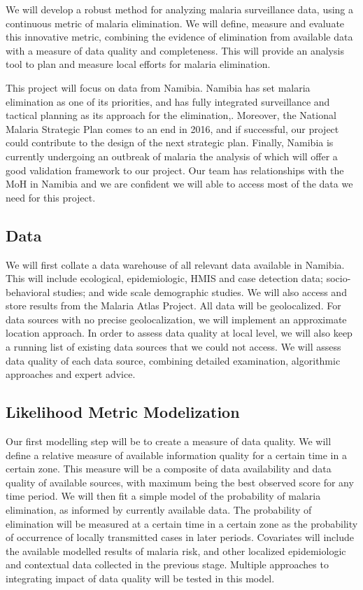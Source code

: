 \documentclass[a4paper,11pt,draft,twoside]{article}
\begin{document}
We will develop a robust method for analyzing malaria surveillance data, using a continuous metric of malaria elimination. We will define, measure and evaluate this innovative metric, combining the evidence of elimination from available data with a measure of data quality and completeness. This will provide an analysis tool to plan and measure local efforts for malaria elimination.

This project will focus on data from Namibia. Namibia has set malaria elimination as one of its priorities\cite{NamibiaElimniation}, and has fully integrated surveillance and tactical planning as its approach for the elimination\cite{StrengtheningTactical},\cite{NamStratPlan}. Moreover, the National Malaria Strategic Plan comes to an end in 2016, and if successful, our project could contribute to the design of the next strategic plan. Finally, Namibia is currently undergoing an outbreak of malaria the analysis of which will offer a good validation framework to our project. Our team has relationships with the MoH in Namibia and we are confident we will able to access most of the data we need for this project.

\subsection{Data}

We will first collate a data warehouse of all relevant data available in Namibia. This will include ecological, epidemiologic, HMIS and case detection data; socio-behavioral studies; and wide scale demographic studies. We will also access and store results from the Malaria Atlas Project. All data will be geolocalized. For data sources with no precise geolocalization, we will implement an approximate location approach. In order to assess data quality at local level, we will also keep a running list of existing data sources that we could not access. We will assess data quality of each data source, combining detailed examination, algorithmic approaches and expert advice.

\subsection{Likelihood Metric Modelization}
Our first modelling step will be to create a measure of data quality. We will define a relative measure of available information quality for a certain time in a certain zone. This measure will be a composite of data availability and data quality of available sources, with maximum being the best observed score for any time period. We will then fit a simple model of the probability of malaria elimination, as informed by currently available data. The probability of elimination will be measured at a certain time in a certain zone as the probability of occurrence of locally transmitted cases in later periods. Covariates will include the available modelled results of malaria risk, and other localized epidemiologic and contextual data collected in the previous stage. Multiple approaches to integrating impact of data quality will be tested in this model.
\end{document}
